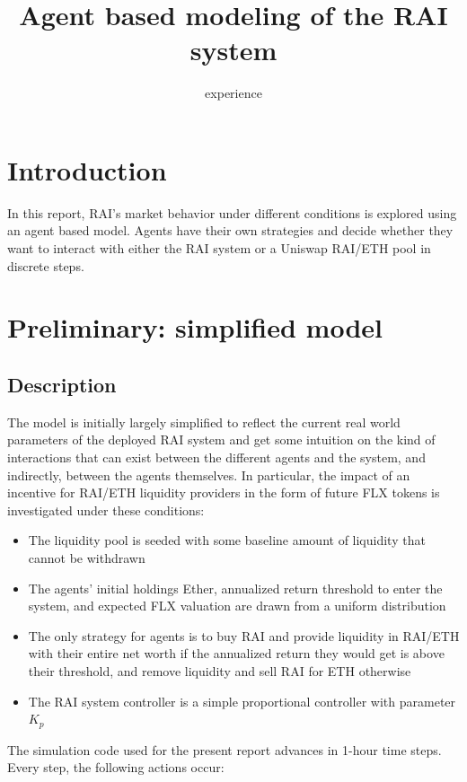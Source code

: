 \documentclass{article}
\title{Agent based modeling of the RAI system}
\author{experience}
\begin{document}
    \maketitle

    \section{Introduction}
    In this report, RAI's market behavior under different conditions is explored using an agent based model. Agents have their own strategies and decide whether they want to interact with either the RAI system or a Uniswap RAI/ETH pool in discrete steps. 
    
    \section{Preliminary: simplified model}

    \subsection{Description}

    The model is initially largely simplified to reflect the current real world parameters of the deployed RAI system and get some intuition on the kind of interactions that can exist between the different agents and the system, and indirectly, between the agents themselves. In particular, the impact of an incentive for RAI/ETH liquidity providers in the form of future FLX tokens is investigated under these conditions: 

    \begin{itemize}
      \item The liquidity pool is seeded with some baseline amount of liquidity that cannot be withdrawn
      \item The agents' initial holdings Ether,  annualized return threshold to enter the system, and expected FLX valuation are drawn from a uniform distribution
      \item The only strategy for agents is to buy RAI and provide liquidity in RAI/ETH with their entire net worth if the annualized return they would get is above their threshold, and remove liquidity and sell RAI for ETH otherwise
      \item The RAI system controller is a simple proportional controller with parameter $K_p$
    \end{itemize}

    The simulation code used for the present report advances in 1-hour time steps. Every step, the following actions occur: 
\end{document}
